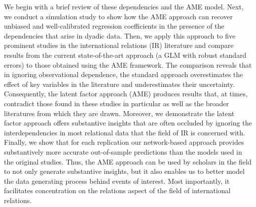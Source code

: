 We begin with a brief review of these dependencies and the AME model. Next, we conduct a simulation study to show how the AME approach can recover unbiased and well-calibrated regression coefficients in the presence of the dependencies that arise in dyadic data. Then, we apply this approach to five prominent studies in the international relations (IR) literature and compare results from the current state-of-the-art approach (a GLM with robust standard errors) to those obtained using the AME framework. The comparison reveals that in ignoring observational dependence, the standard approach overestimates the effect of key variables in the literature and underestimates their uncertainty. Consequently, the latent factor approach (AME) produces results that, at times, contradict those found in these studies in particular as well as the broader literatures from which they are drawn. Moreover, we demonstrate the latent factor approach offers substantive insights that are often occluded by ignoring the interdependencies in most relational data that the field of IR is concerned with. Finally, we show that for each replication our network-based approach provides substantively more accurate out-of-sample predictions than the models used in the original studies. Thus, the AME approach can be used by scholars in the field to not only generate substantive insights, but it also enables us to better model the data generating process behind events of interest.  Most importantly, it facilitates concentration on the relations aspect of the field of international relations.
